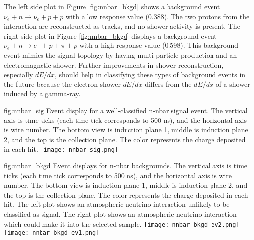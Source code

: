 The left side plot in Figure \ref{fig:nnbar_bkgd} shows a  background event $\nu_{e}+n\rightarrow \nu_{e}+p+p$ with a low  response value (0.388). The two protons from the  interaction are reconstructed as tracks, and no shower activity is present. The right side plot in Figure \ref{fig:nnbar_bkgd} displays a  background event $\nu_{e}+n\rightarrow {e}^{-}+p+\pi +p$ with a high  response value (0.598). This background event mimics the signal topology by having multi-particle production and an electromagnetic shower. Further improvements in shower reconstruction, especially $dE/dx$, should help in classifying these types of background events in the future because the electron shower $dE/dx$ differs from the $dE/dx$ of a shower induced by a gamma-ray.

\begin{dunefigure}
{fig:nnbar_sig}
{Event display for a well-classified n-nbar signal event.  The vertical axis is time ticks (each time tick corresponds to 500 ns), and the horizontal axis is wire number.  The bottom view is induction plane 1, middle is induction plane 2, and the top is the collection plane.  The color represents the charge deposited in each hit.}
\texttt{[image: nnbar\_sig.png]}
\end{dunefigure} 


\begin{dunefigure}
{fig:nnbar_bkgd}
{Event displays for n-nbar backgrounds.  The vertical axis is time ticks (each time tick corresponds to 500 ns), and the horizontal axis is wire number.  The bottom view is induction plane 1, middle is induction plane 2, and the top is the collection plane.  The color represents the charge deposited in each hit.  The left plot shows an atmospheric neutrino interaction unlikely to be classified as signal. The right plot shows an atmospheric neutrino interaction which could make it into the selected sample.}
\texttt{[image: nnbar\_bkgd\_ev2.png]}
\texttt{[image: nnbar\_bkgd\_ev1.png]}
\end{dunefigure} 


